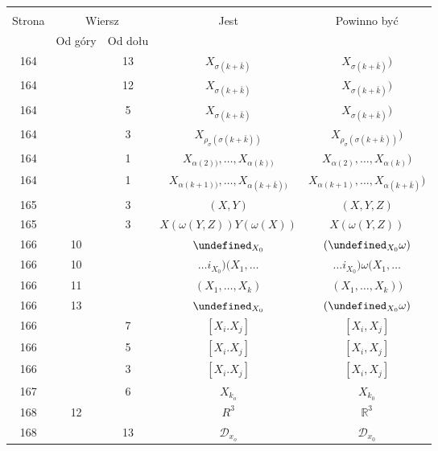 \documentclass[a4paper,11pt]{article}
\newcommand{\mb}{\mathbb}
\newcommand{\mc}{\mathcal}
\newcommand{\ld}{\ldots}
\newcommand{\al}{\alpha}
\newcommand{\om}{\omega}
\newcommand{\s}{\sigma}
\newcommand{\R}{\mb{R}}
\newcommand{\D}{\mc{D}}
\let\L\undefined
\newcommand{\L}{\mc{L}}
\begin{document}
\begin{center}
  \begin{tabular}{|c|c|c|c|c|}
    \hline
    & \multicolumn{2}{c|}{} & & \\
    Strona & \multicolumn{2}{c|}{Wiersz} & Jest
                              & Powinno być \\ \cline{2-3}
    & Od góry & Od dołu &  &  \\
    \hline
    164 & & 13 & $X_{ \s( k + \bar{ k } ) }$
           & $X_{ \s( k + \bar{ k } ) } )$ \\
    164 & & 12 & $X_{ \s( k + \bar{ k } ) }$
           & $X_{ \s( k + \bar{ k } ) } )$ \\
    164 & &  5 & $X_{ \s( k + \bar{ k } ) }$
           & $X_{ \s( k + \bar{ k } ) } )$ \\
    164 & &  3 & $X_{ \rho_{ \s }( \s( k + \bar{ k } ) ) }$
           & $X_{ \rho_{ \s }( \s( k + \bar{ k } ) ) } )$ \\
    164 & &  1 & $X_{ \al( 2 ) ) }, \ld, X_{ \al( k ) ) }$
           & $X_{ \al( 2 ) }, \ld, X_{ \al( k ) } )$ \\
    164 & &  1 & $X_{ \al( k + 1 ) ) }, \ld, X_{ \al( k + \bar{ k } ) ) }$
           & $X_{ \al( k + 1 ) }, \ld, X_{ \al( k + \bar{ k } ) } )$ \\
    165 & &  3 & $( X, Y )$ & $( X, Y, Z )$ \\
    165 & &  3 & $X( \om( Y, Z ) ) Y( \om( X ) )$
           & $X( \om( Y, Z ) )$ \\
    166 & 10 & & $\L_{ { X_{ 0 } } }$ & $( \L_{ { X_{ 0 } } } \om )$ \\
    166 & 10 & & $\ld i_{ { X_{ 0 } } } ) ( X_{ 1 }, \ld$
           & $\ld i_{ { X_{ 0 } } } ) \om( X_{ 1 }, \ld$ \\
    166 & 11 & & $( X_{ 1 }, \ld, X_{ k } )$ & $( X_{ 1 }, \ld,
                                               X_{ k } ))$ \\
    166 & 13 & & $\L_{ { X_{ 0 } } }$ & $( \L_{ { X_{ 0 } } } \om )$ \\
    166 & &  7 & $[ X_{ i }. X_{ j } ]$ & $[ X_{ i }, X_{ j } ]$ \\
    166 & &  5 & $[ X_{ i }. X_{ j } ]$ & $[ X_{ i }, X_{ j } ]$ \\
    166 & &  3 & $[ X_{ i }. X_{ j } ]$ & $[ X_{ i }, X_{ j } ]$ \\
    167 & &  6 & $X_{ k_{ o } }$ & $X_{ k_{ 0 } }$ \\
    168 & 12 & & $R^{ 3 }$ & $\R^{ 3 }$ \\
    168 & & 13 & $\D_{ x_{ o } }$ & $\D_{ x_{ 0 } }$ \\

\end{tabular}
\end{center}
\end{document}
